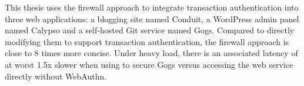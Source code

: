 This thesis uses the firewall approach to integrate transaction authentication into three web applications: a blogging site named Conduit, a WordPress admin panel named Calypso and a self-hosted Git service named Gogs. Compared to directly modifying them to support transaction authentication, the firewall approach is close to 8 times more concise. Under heavy load, there is an associated latency of at worst 1.5x slower when using \sys{} to secure Gogs versus accessing the web service directly without WebAuthn.

